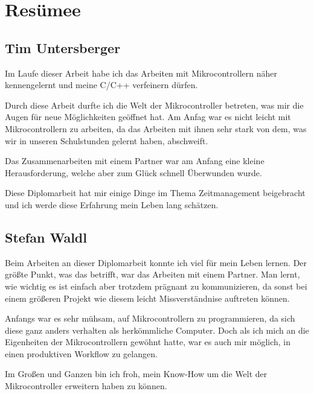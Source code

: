 \chapter{Resümee}

\section{Tim Untersberger}

Im Laufe dieser Arbeit habe ich das Arbeiten mit Mikrocontrollern näher kennengelernt und meine C/C++ verfeinern dürfen.

Durch diese Arbeit durfte ich die Welt der Mikrocontroller betreten, was mir die Augen für neue Möglichkeiten geöffnet hat. Am Anfag war es nicht leicht mit Mikrocontrollern zu arbeiten, da das Arbeiten mit ihnen sehr stark von dem, was wir in unseren Schulstunden gelernt haben, abschweift.

Das Zusammenarbeiten mit einem Partner war am Anfang eine kleine Herausforderung, welche aber zum Glück schnell Überwunden wurde.

Diese Diplomarbeit hat mir einige Dinge im Thema Zeitmanagement beigebracht und ich werde diese Erfahrung mein Leben lang schätzen.

\section{Stefan Waldl}
Beim Arbeiten an dieser Diplomarbeit konnte ich viel für mein Leben lernen. Der größte Punkt, was das betrifft, war das Arbeiten mit einem Partner. Man lernt, wie wichtig es ist einfach aber trotzdem prägnant zu kommunizieren, da sonst bei einem größeren Projekt wie diesem leicht Missverständnise auftreten können.

Anfangs war es sehr mühsam, auf Mikrocontrollern zu programmieren, da sich diese ganz anders verhalten als herkömmliche Computer. Doch als ich mich an die Eigenheiten der Mikrocontrollern gewöhnt hatte, war es auch mir möglich, in einen produktiven Workflow zu gelangen.

Im Großen und Ganzen bin ich froh, mein Know-How um die Welt der Mikrocontroller erweitern haben zu können.